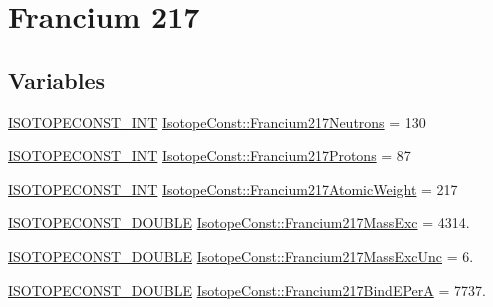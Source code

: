 \hypertarget{group___isotope_const-_francium-_fr217}{}\section{Francium 217}
\label{group___isotope_const-_francium-_fr217}
\subsection*{Variables}
\begin{DoxyCompactItemize}
\item 
\mbox{\hyperlink{group___isotope_const-_macros_ga5f18360b3e99483a35c32d789e62621c}{I\+S\+O\+T\+O\+P\+E\+C\+O\+N\+S\+T\+\_\+\+I\+NT}} \mbox{\hyperlink{group___isotope_const-_francium-_fr217_gab43ef4515c104a9cc8adea6259d98af5}{Isotope\+Const\+::\+Francium217\+Neutrons}} = 130
\item 
\mbox{\hyperlink{group___isotope_const-_macros_ga5f18360b3e99483a35c32d789e62621c}{I\+S\+O\+T\+O\+P\+E\+C\+O\+N\+S\+T\+\_\+\+I\+NT}} \mbox{\hyperlink{group___isotope_const-_francium-_fr217_gaf6d8392b1b57ecaf8941ea2f366a69a8}{Isotope\+Const\+::\+Francium217\+Protons}} = 87
\item 
\mbox{\hyperlink{group___isotope_const-_macros_ga5f18360b3e99483a35c32d789e62621c}{I\+S\+O\+T\+O\+P\+E\+C\+O\+N\+S\+T\+\_\+\+I\+NT}} \mbox{\hyperlink{group___isotope_const-_francium-_fr217_ga8b65b93aa1b82335e04d5936fd0bdeaa}{Isotope\+Const\+::\+Francium217\+Atomic\+Weight}} = 217
\item 
\mbox{\hyperlink{group___isotope_const-_macros_ga8f45a7272ce02c0b4c65c44636ed719a}{I\+S\+O\+T\+O\+P\+E\+C\+O\+N\+S\+T\+\_\+\+D\+O\+U\+B\+LE}} \mbox{\hyperlink{group___isotope_const-_francium-_fr217_ga7a247d052ab9053460dff553d721cded}{Isotope\+Const\+::\+Francium217\+Mass\+Exc}} = 4314.
\item 
\mbox{\hyperlink{group___isotope_const-_macros_ga8f45a7272ce02c0b4c65c44636ed719a}{I\+S\+O\+T\+O\+P\+E\+C\+O\+N\+S\+T\+\_\+\+D\+O\+U\+B\+LE}} \mbox{\hyperlink{group___isotope_const-_francium-_fr217_ga35421fad4e6cccf61858a58d74ded5ef}{Isotope\+Const\+::\+Francium217\+Mass\+Exc\+Unc}} = 6.
\item 
\mbox{\hyperlink{group___isotope_const-_macros_ga8f45a7272ce02c0b4c65c44636ed719a}{I\+S\+O\+T\+O\+P\+E\+C\+O\+N\+S\+T\+\_\+\+D\+O\+U\+B\+LE}} \mbox{\hyperlink{group___isotope_const-_francium-_fr217_gab5b050603c40986b9aae279033c14d2a}{Isotope\+Const\+::\+Francium217\+Bind\+E\+PerA}} = 7737.
\item 

\end{DoxyCompactItemize}
